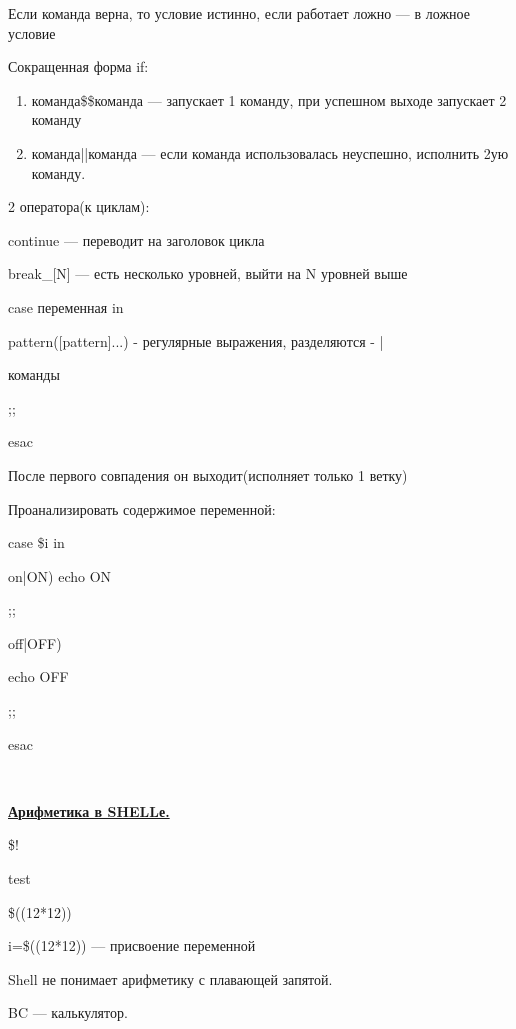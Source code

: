 \par 
Если команда верна, то условие истинно,
если работает ложно — в ложное условие
\par 
Сокращенная форма if:
\begin{enumerate}
	\item \par 
	команда\$\$команда — запускает 1 команду,
	при успешном выходе запускает 2 команду
	\item \par 
	команда||команда — если команда
	использовалась неуспешно, исполнить
	2ую команду.
\end{enumerate}
\par 
2 оператора(к циклам):
\par 
continue — переводит на заголовок цикла
\par 
break\_[N] — есть несколько уровней, выйти
на N уровней выше
\par 
case переменная in
\par 
pattern([pattern]...) - регулярные выражения,
разделяются - |
\par 
команды
\par 
;;
\par 
esac
\par 
После первого совпадения он выходит(исполняет
только 1 ветку)
\par 
Проанализировать содержимое переменной:
\par 
case \$i in
\par 
on|ON) echo ON
\par 
;;
\par 
off|OFF)
\par 
echo OFF
\par 
;;
\par 
esac
\par 
\\

\par \underline{\textbf{Арифметика
в SHELLе.}}
\par 
\$!
\par 
test
\par 
\$((12*12))
\par 
i=\$((12*12)) — присвоение переменной
\par 
Shell не понимает арифметику с плавающей
запятой.
\par 
BC — калькулятор.
\par 
\\


